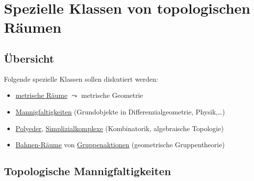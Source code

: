 \chapter{Spezielle Klassen von topologischen Räumen}

\section{Übersicht}

Folgende spezielle Klassen sollen diskutiert werden:
\begin{itemize}
  \item \hyperref[def:metrischerRaum]{metrische Räume} $ \leadsto $ metrische Geometrie
  \item \hyperref[def:topologischeMannigfaltigkeit]{Mannigfaltigkeiten} (Grundobjekte in Differenzialgeometrie, Physik,\dots)
  \item \hyperref[def:polyeder]{Polyeder}, \hyperref[def:simplizialkomplex]{Simplizialkomplexe} (Kombinatorik, algebraische Topologie)
  \item \hyperref[def:bahnenraum]{Bahnen-Räume} von \hyperref[def:gruppenaktion]{Gruppenaktionen} (geometrische Gruppentheorie)
\end{itemize}

\section{Topologische Mannigfaltigkeiten}


